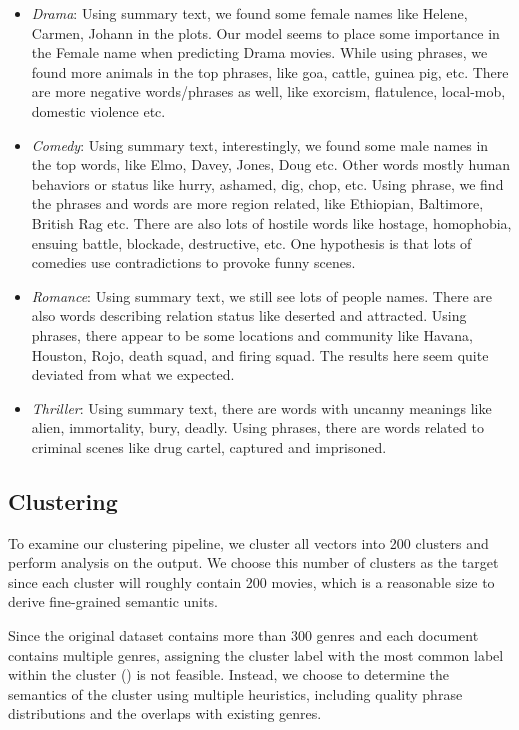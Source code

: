 \documentclass{article}
\begin{document}
\begin{multicols}{2}
\begin{itemize}
    \item  \textit{Drama}: Using summary text, we found some female names like Helene, Carmen, Johann in the plots. Our model seems to place some importance in the Female name when predicting Drama movies. While using phrases, we found more animals in the top phrases, like goa, cattle, guinea pig, etc. There are more negative words/phrases as well, like exorcism, flatulence, local-mob, domestic violence etc. 
    \item \textit{Comedy}: Using summary text, interestingly, we found some male names in the top words, like Elmo, Davey, Jones, Doug etc. Other words mostly human behaviors or status like hurry, ashamed, dig, chop, etc. Using phrase, we find the phrases and words are more region related, like Ethiopian, Baltimore, British Rag etc. There are also lots of hostile words like hostage, homophobia, ensuing battle, blockade, destructive, etc. One hypothesis is that lots of comedies use contradictions to provoke funny scenes. 
    \item \textit{Romance}: Using summary text, we still see lots of people names. There are also words describing relation status like deserted and attracted. Using phrases, there appear to be some locations and community like Havana, Houston, Rojo, death squad, and firing squad. The results here seem quite deviated from what we expected.
    \item \textit{Thriller}: Using summary text, there are words with uncanny meanings like alien, immortality, bury, deadly. Using phrases, there are words related to criminal scenes like drug cartel, captured and imprisoned.
\end{itemize}

\subsection{Clustering}

To examine our clustering pipeline, we cluster all vectors into 200 clusters and perform analysis on the output. We choose this number of clusters as the target since each cluster will roughly contain 200 movies, which is a reasonable size to derive fine-grained semantic units.

Since the original dataset contains more than 300 genres and each document contains multiple genres, assigning the cluster label with the most common label within the cluster (\cite{aharoni-goldberg-2020-unsupervised}) is not feasible. Instead, we choose to determine the semantics of the cluster using multiple heuristics, including quality phrase distributions and the overlaps with existing genres.


\end{multicols}
\end{document}
